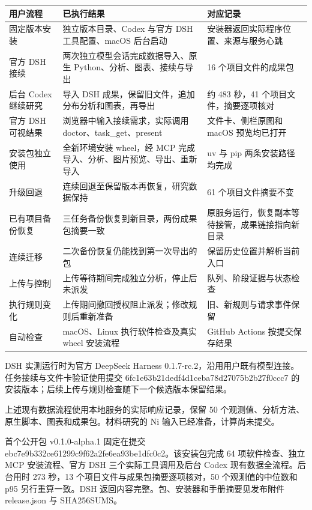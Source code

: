 \documentclass[11pt,a4paper]{ctexart}
\begin{document}
\begin{longtable}{p{4.67cm}p{4.67cm}p{4.67cm}}
\toprule
用户流程 & 已执行结果 & 对应记录 \\
\midrule\endhead
固定版本安装 & 独立版本目录、Codex 与官方 DSH 工具配置、macOS 后台启动 & 安装器返回实际程序位置、来源与服务心跳 \\
官方 DSH 接续 & 两次独立模型会话完成数据导入、原生 Python、分析、图表、接续与导出 & 16 个项目文件的成果包 \\
后台 Codex 继续研究 & 导入 DSH 成果，保留旧文件，追加分布分析和图表，再导出 & 约 483 秒，41 个项目文件，摘要逐项核对 \\
官方 DSH 可视结果 & 浏览器中输入接续需求，实际调用 doctor、task\_\allowbreak{}get、present & 文件卡、侧栏原图和 macOS 预览均已打开 \\
安装包独立使用 & 全新环境安装 wheel，经 MCP 完成导入、分析、图片预览、导出、重新导入 & uv 与 pip 两条安装路径均完成 \\
升级回退 & 连续回退至保留版本再恢复，研究数据保持 & 61 个项目文件摘要不变 \\
已有项目备份恢复 & 三任务备份恢复到新目录，两份成果包摘要一致 & 原服务运行，恢复副本等待接管，成果链接指向新目录 \\
连续迁移 & 二次备份恢复仍能找到第一次导出的包 & 保留历史位置并解析当前入口 \\
上传与控制 & 上传等待期间完成独立分析，停止后未派发 & 队列、阶段证据与状态检查 \\
执行规则变化 & 上传期间撤回授权阻止派发；修改规则后重新准备 & 旧、新规则与请求事件保留 \\
自动检查 & macOS、Linux 执行软件检查及真实 wheel 安装流程 & GitHub Actions 按提交保存结果 \\
\bottomrule
\end{longtable}


DSH 实测运行时为官方 DeepSeek Harness 0.1.7-rc.2，沿用用户既有模型连接。任务接续与文件卡验证使用提交 6fc1e63b\allowbreak{}21dedf4d\allowbreak{}1ceba78d\allowbreak{}27075b2b\allowbreak{}27f0ccc7 的安装版本；后续上传与规则检查随下一个候选版本保留结果。



上述现有数据流程使用本地服务的实际响应记录，保留 50 个观测值、分析方法、原生脚本、图表和成果包。材料研究的 Ni 输入已经准备，计算尚未提交。



首个公开包 v0.1.0-alpha.1 固定在提交 ebc7e9b3\allowbreak{}32ce6129\allowbreak{}9c9f62a2\allowbreak{}fe6ea93b\allowbreak{}e1dfc0c2。该安装包完成 64 项软件检查、独立 MCP 安装流程、官方 DSH 三个实际工具调用及后台 Codex 现有数据全流程。后台用时 273 秒，13 个项目文件与成果包摘要逐项核对，50 个观测值的中位数和 p95 另行重算一致。DSH 返回内容完整。包、安装器和手册摘要见发布附件 release.json 与 SHA256SUMS。
\end{document}
